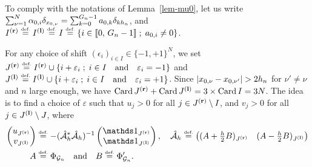 To comply with the notations of Lemma~\ref{lem-mu0}, let us write  $\sum_{\nu=1}^N\alpha_{0,i}\delta_{x_{0,\nu}}= \sum_{k=0}^{{G_n}-1} a_{0,k}\delta_{k{h_n}}$, and ${I^{\mathbf{(r)}}}\stackrel{\mbox{\upshape\tiny def.}}{=} {I^{\mathbf{(l)}}}\stackrel{\mbox{\upshape\tiny def.}}{=} I\stackrel{\mbox{\upshape\tiny def.}}{=}\left\{ i\in\llbracket 0,\,{G_n}-1 \rrbracket \;;\; a_{0,i}\neq 0 \right\}$. 

For any choice of shift $(\epsilon_i)_{i\in I}\in \{-1,+1\}^{N}$, we set ${J^{\mathbf{(r)}}} \stackrel{\mbox{\upshape\tiny def.}}{=} {I^{\mathbf{(r)}}}\cup\left\{ i+\varepsilon_i \;;\; i\in I \quad \text{and} \quad\varepsilon_i=-1 \right\}$ and ${J^{\mathbf{(l)}}}\stackrel{\mbox{\upshape\tiny def.}}{=} {I^{\mathbf{(l)}}}\cup\left\{ i+\varepsilon_i \;;\; i\in I\quad \text{and} \quad\varepsilon_i=+1 \right\}$.
  Since $|x_{0,\nu}-x_{0,\nu'}|> {2}{\stepsizen}$ for $\nu'\neq \nu$ and $n$ large enough, we have $\operatorname{Card} {J^{\mathbf{(r)}}}+\operatorname{Card} {J^{\mathbf{(l)}}}=3\times \operatorname{Card} I=3N$. 
The idea is to find a choice of $\varepsilon$ such that $u_j > 0$ for all $j\in {J^{\mathbf{(r)}}}\setminus I$, and $v_j> 0$ for all $j\in {J^{\mathbf{(l)}}}\setminus J$, where
\begin{align*}
  \begin{pmatrix} u_{\Jup}\\v_{\Jdown} \end{pmatrix}&\eqdef-(\Copt^*\Copt)^{-1}\begin{pmatrix}
    \bun_{\Jup}\\\bun_{\Jdown}\end{pmatrix}, \quad
\Copt \eqdef\begin{pmatrix}(\OpU+\frac{\stepsize}{2}\OpD)_{\Jup} &(\OpU-\frac{\stepsize}{2}\OpD)_{\Jdown}\end{pmatrix}\\
\OpU &\eqdef \Phi_{\Gg_n} \qandq \OpD\eqdef\Phi'_{\Gg_n}.
\end{align*} 


